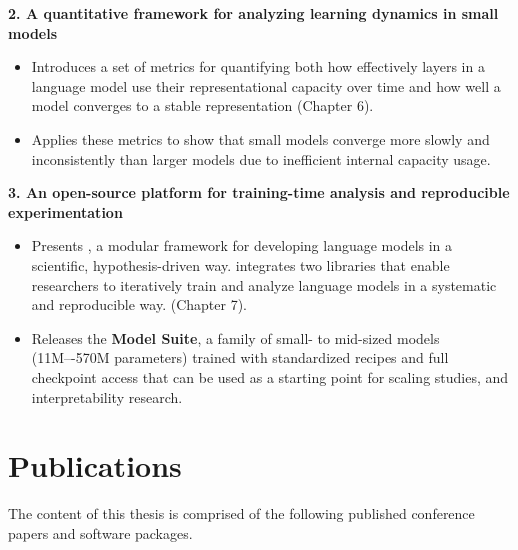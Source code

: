 \textbf{2. A quantitative framework for analyzing learning dynamics in small models}

\begin{itemize}
    \item Introduces a set of metrics for quantifying both how effectively layers in a language model use their representational capacity over time and how well a model converges to a stable representation (Chapter 6).

    \item Applies these metrics to show that small models converge more slowly and inconsistently than larger models due to inefficient internal capacity usage.

\end{itemize}

\textbf{3. An open-source platform for training-time analysis and reproducible experimentation}
\begin{itemize}
    \item Presents \textbf{\pico}, a modular framework for developing language models in a scientific, hypothesis-driven way. \pico integrates two libraries that enable researchers to iteratively train and analyze language models in a systematic and reproducible way. (Chapter 7).

    \item Releases the \textbf{\pico Model Suite}, a family of small- to mid-sized models (11M–-570M parameters) trained with standardized recipes and full checkpoint access that can be used as a starting point for scaling studies, and interpretability research.
\end{itemize}

\newpage
\section*{Publications}

The content of this thesis is comprised of the following published conference papers and software packages.

